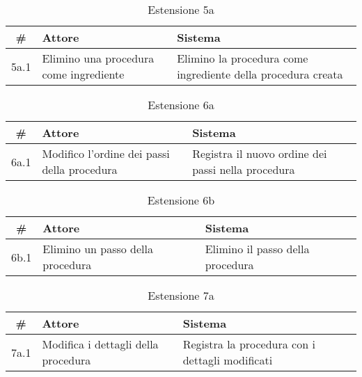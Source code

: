 \begin{table}[H]\centering\caption*{Estensione 5a}
      \small
      \begin{tabular}{|c|p{7cm}|p{6.24cm}|}
            \hline\bfseries \# & \bfseries Attore                       & \bfseries Sistema                                            \\\hline
            5a.1               & Elimino una procedura come ingrediente & Elimino la procedura come ingrediente della procedura creata \\\hline
      \end{tabular}
\end{table}

\begin{table}[H]\centering\caption*{Estensione 6a}
      \small
      \begin{tabular}{|c|p{7cm}|p{6.24cm}|}
            \hline\bfseries \# & \bfseries Attore                                          & \bfseries Sistema                                  \\\hline
            6a.1               & Modifico l’ordine dei passi della procedura & Registra il nuovo ordine dei passi nella procedura \\\hline
      \end{tabular}
\end{table}

\begin{table}[H]\centering\caption*{Estensione 6b}
      \small
      \begin{tabular}{|c|p{7cm}|p{6.24cm}|}
            \hline\bfseries \# & \bfseries Attore                               & \bfseries Sistema                \\\hline
            6b.1               & Elimino un passo della procedura & Elimino il passo della procedura \\\hline
      \end{tabular}
\end{table}

\begin{table}[H]\centering\caption*{Estensione 7a}
      \small
      \begin{tabular}{|c|p{7cm}|p{6.24cm}|}
            \hline\bfseries \# & \bfseries Attore                                  & \bfseries Sistema                               \\\hline
            7a.1               & Modifica i dettagli della procedura & Registra la procedura con i dettagli modificati \\\hline
      \end{tabular}
\end{table}

